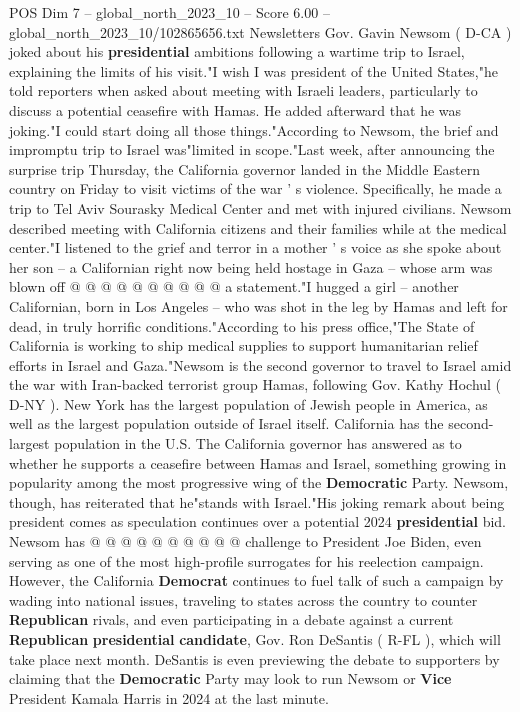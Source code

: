 \begin{textsample}{POS Dim 7 – global\_north\_2023\_10 – Score 6.00 – global\_north\_2023\_10/102865656.txt}  \label{ex:f7_pos_253}
Newsletters Gov.
Gavin Newsom ( D-CA ) joked about his \textbf{presidential} ambitions following a wartime trip to Israel, explaining the limits of his visit."I wish I was president of the United States,"he told reporters when asked about meeting with Israeli leaders, particularly to discuss a potential ceasefire with Hamas.
He added afterward that he was joking."I could start doing all those things."According to Newsom, the brief and impromptu trip to Israel was"limited in scope."Last week, after announcing the surprise trip Thursday, the California governor landed in the Middle Eastern country on Friday to visit victims of the war ' s violence.
Specifically, he made a trip to Tel Aviv Sourasky Medical Center and met with injured civilians.
Newsom described meeting with California citizens and their families while at the medical center."I listened to the grief and terror in a mother ' s voice as she spoke about her son -- a Californian right now being held hostage in Gaza -- whose arm was blown off @ @ @ @ @ @ @ @ @ @ a statement."I hugged a girl -- another Californian, born in Los Angeles -- who was shot in the leg by Hamas and left for dead, in truly horrific conditions."According to his press office,"The State of California is working to ship medical supplies to support humanitarian relief efforts in Israel and Gaza."Newsom is the second governor to travel to Israel amid the war with Iran-backed terrorist group Hamas, following Gov.
Kathy Hochul ( D-NY ).
New York has the largest population of Jewish people in America, as well as the largest population outside of Israel itself.
California has the second-largest population in the U.S.
The California governor has answered as to whether he supports a ceasefire between Hamas and Israel, something growing in popularity among the most progressive wing of the \textbf{Democratic} Party.
Newsom, though, has reiterated that he"stands with Israel."His joking remark about being president comes as speculation continues over a potential 2024 \textbf{presidential} bid.
Newsom has @ @ @ @ @ @ @ @ @ @ challenge to President Joe Biden, even serving as one of the most high-profile surrogates for his reelection campaign.
However, the California \textbf{Democrat} continues to fuel talk of such a campaign by wading into national issues, traveling to states across the country to counter \textbf{Republican} rivals, and even participating in a debate against a current \textbf{Republican} \textbf{presidential} \textbf{candidate}, Gov.
Ron DeSantis ( R-FL ), which will take place next month.
DeSantis is even previewing the debate to supporters by claiming that the \textbf{Democratic} Party may look to run Newsom or \textbf{Vice} President Kamala Harris in 2024 at the last minute.

\end{textsample}
